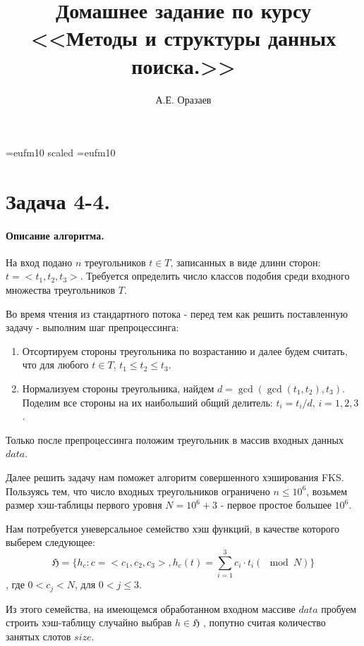 \documentclass[12pt]{article}
\title{\bf Домашнее задание по курсу \\ <<Методы
и структуры данных поиска.>>}
\author{А.Е. Оразаев}
\date{}
\begin{document}
\voffset=-20mm
\hoffset=-12mm
\font\Got=eufm10 scaled \font\Got=eufm10

\maketitle

\section{Задача 4-4.}
\paragraph{Описание алгоритма.}
На вход подано $ n $ треугольников $ t \in T $, записанных
в виде длинн сторон: $ t = <t_1, t_2, t_3> $. Требуется определить
число классов подобия среди входного множества треугольников $ T $.

Во время чтения из стандартного потока - перед тем как решить
поставленную задачу - выполним шаг препроцессинга:
\begin{enumerate}
    \item Отсортируем стороны треугольника по возрастанию и далее
          будем считать, что для любого $ t \in T $, $ t_1 \le t_2 \le t_3 $.

    \item Нормализуем стороны треугольника, найдем
          $ d = \gcd(\gcd(t_1, t_2), t_3) $. Поделим все стороны на их
          наибольший общий делитель: $ t_i = t_i / d \mbox{, } i = 1, 2, 3 $.

\end{enumerate}

Только после препроцессинга положим треугольник в массив входных данных
$ data $.

Далее решить задачу нам поможет алгоритм совершенного хэширования FKS.
Пользуясь тем, что число входных треугольников ограничено $ n \le 10^6 $,
возьмем размер хэш-таблицы первого уровня $ N = 10^6 + 3 $ - первое простое
большее $ 10^6 $.

Нам потребуется уневерсальное семейство хэш функций, в качестве которого
выберем следующее:
$$
\mathfrak{H} = \{ h_c: c = <c_1, c_2, c_3>,
h_c(t) = \sum_{i=1}^3 c_i \cdot t_i (\mod N) \}
$$
, где $ 0 < c_j < N $, для $  0 < j \le 3 $.

Из этого семейства, на имеющемся обработанном входном массиве $ data $
пробуем строить хэш-таблицу случайно выбрав $ h \in \mathfrak{H} $
, попутно считая количество занятых слотов $ size $.
\end{document}
